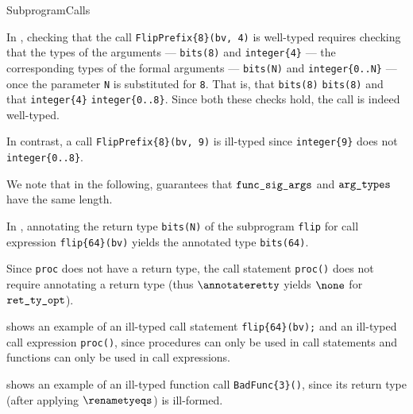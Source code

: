 \begin{TypingRuleList}{SubprogramCalls}


In , checking that the call \verb|FlipPrefix{8}(bv, 4)| is well-typed
requires checking that the types of the arguments --- \verb|bits(8)| and \verb|integer{4}| ---
\typesatisfyterm{} the corresponding types of the formal arguments --- \verb|bits(N)| and \verb|integer{0..N}| ---
once the parameter \verb|N| is substituted for \verb|8|.
That is, that \verb|bits(8)| \typesatisfiesterm{} \verb|bits(8)| and that
\verb|integer{4}| \typesatisfiesterm{} \verb|integer{0..8}|.
Since both these checks hold, the call is indeed well-typed.

In contrast, a call \verb|FlipPrefix{8}(bv, 9)| is ill-typed since
\verb|integer{9}| does not \typesatisfyterm{} \verb|integer{0..8}|.

We note that in the following,  guarantees
that $\texttt{func\_sig\_args}$ and $\texttt{arg\_types}$ have the same length.



In , annotating the return type \verb|bits(N)| of the subprogram \verb|flip|
for call expression \verb|flip{64}(bv)| yields the annotated type \verb|bits(64)|.

Since \verb|proc| does not have a return type, the call statement \verb|proc()| does not require
annotating a return type (thus $\annotateretty$ yields $\none$ for $\texttt{ret\_ty\_opt}$).

 shows an example of an ill-typed call statement \verb|flip{64}(bv);|
and an ill-typed call expression \verb|proc()|, since procedures can only be used in call statements
and functions can only be used in call expressions.

 shows an example of an ill-typed function call \verb|BadFunc{3}()|, since its return type (after applying $\renametyeqs$) is ill-formed.



\end{TypingRuleList}
